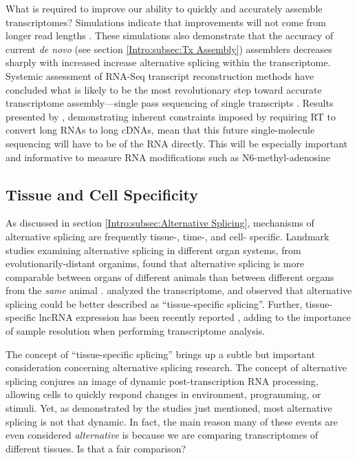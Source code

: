     What is required to improve our ability to quickly and accurately assemble transcriptomes? Simulations indicate that improvements will not come from longer read lengths \citep{Chang2014c}. These simulations also demonstrate that the accuracy of current \textit{de novo} (see section \ref{Intro:subsec:Tx Assembly}) assemblers decreases sharply with increased increase alternative splicing within the transcriptome. Systemic assessment of RNA-Seq transcript reconstruction methods have concluded what is likely to be the most revolutionary step toward accurate transcriptome assembly---single pass sequencing of single transcripts \citep{Engstrom2013,Steijger2013}. Results presented by \citep{Sharon2013}, demonstrating inherent constraints imposed by requiring RT to convert long RNAs to long cDNAs, mean that this future single-molecule sequencing will have to be of the RNA directly. This will be especially important and informative to measure RNA modifications such as N6-methyl-adenosine \citep{Pan2013}

  \subsection{Tissue and Cell Specificity}
    \label{Disc:subsec:Tissue-specific Tx expression}

    As discussed in section \ref{Intro:subsec:Alternative Splicing}, mechanisms of alternative splicing are frequently tissue-, time-, and cell- specific. Landmark studies examining alternative splicing in different organ systems, from evolutionarily-distant organims, found that alternative splicing is more comparable between organs of different animals than between different organs from the \textit{same} animal \citep{Barbosa-Morais2012,Merkin2012}. \citet{Brown2014} analyzed the \flies{} transcriptome, and observed that alternative splicing could be better described as ``tissue-specific splicing''. Further, tissue-specific lncRNA expression has been recently reported \citep{Washietl2014}, adding to the importance of sample resolution when performing transcriptome analysis.

    The concept of ``tissue-specific splicing'' brings up a subtle but important consideration concerning alternative splicing research. The concept of alternative splicing conjures an image of dynamic post-transcription RNA processing, allowing cells to quickly respond changes in environment, programming, or stimuli. Yet, as demonstrated by the studies just mentioned, most alternative splicing is not that dynamic. In fact, the main reason many of these events are even considered \textit{alternative} is because we are comparing transcriptomes of different tissues. Is that a fair comparison?

